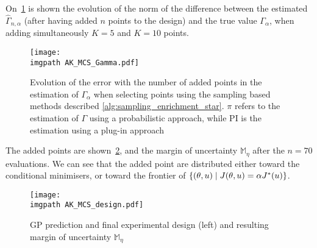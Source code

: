 \documentclass[../../Main_ManuscritThese.tex]{subfiles}
\newcommand\imgpath{/home/victor/acadwriting/Manuscrit/Text/Chapter4/img/}
\begin{document}
On~\cref{fig:AK_MCS_Gamma} is shown the evolution of the norm of the
difference between the estimated $\hat{\Gamma}_{n,\alpha}$ (after
having added $n$ points to the design) and the true value
$\Gamma_{\alpha}$, when adding simultaneously $K=5$ and $K=10$ points.

\begin{figure}[ht]
  \centering
  \texttt{[image: \\imgpath AK\_MCS\_Gamma.pdf]}
  \caption{\label{fig:AK_MCS_Gamma} Evolution of the error with the
number of added points in the estimation of $\Gamma_{\alpha}$ when
selecting points using the sampling based methods described \cref{alg:sampling_enrichment_star}. $\pi$ refers to the estimation of $\Gamma$ using a probabilistic approach, while $\mathrm{PI}$ is the estimation using a plug-in approach}
\end{figure}
The added points are shown~\cref{fig:AK_MCS_design}, and the margin of
uncertainty $\mathbb{M}_{\eta}$ after the $n=70$ evaluations. We can
see that the added point are distributed either toward the conditional
minimisers, or toward the frontier of
$\{(\theta, u) \mid J(\theta, u) = \alpha J^*(u)\}$.
\begin{figure}[ht]
  \centering
  \texttt{[image: \\imgpath AK\_MCS\_design.pdf]}
  \caption{\label{fig:AK_MCS_design} GP prediction and final
    experimental design (left) and resulting margin of uncertainty
    $\mathbb{M}_{\eta}$}
\end{figure}


\end{document}
